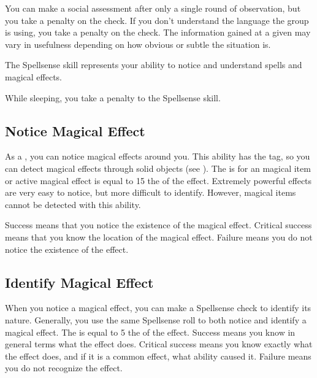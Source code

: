         You can make a social assessment after only a single round of observation, but you take a  penalty on the check.
        If you don't understand the language the group is using, you take a  penalty on the check.
        The information gained at a given  may vary in usefulness depending on how obvious or subtle the situation is.

\newpage
{}
        The Spellsense skill represents your ability to notice and understand spells and magical effects.

        While sleeping, you take a  penalty to the Spellsense skill.


    \subsection{Notice Magical Effect}
        As a , you can notice magical effects around you.
        This ability has the  tag, so you can detect magical effects through solid objects (see ).
        The  is for an  magical item or active magical effect is equal to 15 \sub the  of the effect.
        Extremely powerful effects are very easy to notice, but more difficult to identify.
        However,  magical items cannot be detected with this ability.

        Success means that you notice the existence of the magical effect.
        Critical success means that you know the location of the magical effect.
        Failure means you do not notice the existence of the effect.
        

    \subsection{Identify Magical Effect}
        When you notice a magical effect, you can make a Spellsense check to identify its nature.
        Generally, you use the same Spellsense roll to both notice and identify a magical effect.
        The  is equal to 5 \add the  of the effect.
        Success means you know in general terms what the effect does.
        Critical success means you know exactly what the effect does, and if it is a common effect, what ability caused it.
        Failure means you do not recognize the effect.

